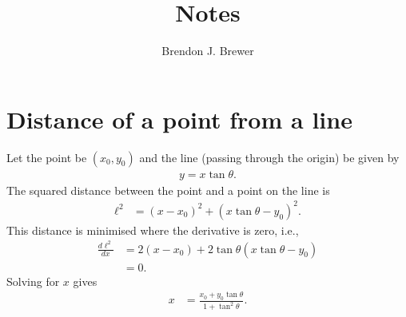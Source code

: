 \documentclass[a4paper, 12pt]{article}
\title{Notes}
\author{Brendon J. Brewer}
\date{}
\begin{document}
\maketitle


\setlength{\parindent}{0pt}
\setlength{\parskip}{8pt}

\section{Distance of a point from a line}
Let the point be $(x_0, y_0)$ and the line (passing through the origin) be
given by
\begin{align}
y = x \tan \theta.
\end{align}
The squared distance between the point and a point on the line is
\begin{align}
\ell^2 &= \left(x - x_0\right)^2 +
       \left(x\tan\theta - y_0\right)^2.
\end{align}
This distance is minimised where the derivative is zero, i.e.,
\begin{align}
\frac{d\ell^2}{dx} &= 2\left(x - x_0\right) +
                      2\tan\theta\left(x\tan\theta - y_0\right) \\
                   &= 0.
\end{align}
Solving for $x$ gives
\begin{align}
x &= \frac{x_0 + y_0\tan\theta}{1 + \tan^2\theta}.
\end{align}






\end{document}
